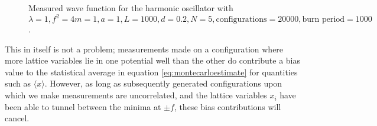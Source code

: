 \documentclass[12pt]{article}
\begin{document}
                \begin{figure}
                    \centering
                    \caption{Measured wave function for the harmonic oscillator with $\lambda = 1, f^2=4 m = 1, a = 1, L = 1000, d = 0.2, N = 5, \text{configurations} = 20000, \text{burn period} = 1000$.}
                    \label{fig:AnharmonicOscillatorIsolatedModes}
                \end{figure}
    This in itself is not a problem; measurements made on a configuration where more lattice variables lie in one potential well than the other do contribute a bias value to the statistical average in equation \ref{eq:montecarloestimate} for quantities such as $\langle x \rangle$. However, as long as subsequently generated configurations upon which we make measurements are uncorrelated, and the lattice variables $x_i$ have been able to tunnel between the minima at $\pm f$, these bias contributions will cancel.
\end{document}
